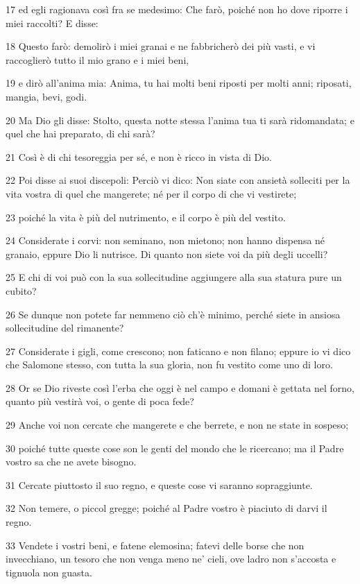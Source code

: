\par 17 ed egli ragionava così fra se medesimo: Che farò, poiché non ho dove riporre i miei raccolti? E disse:
\par 18 Questo farò: demolirò i miei granai e ne fabbricherò dei più vasti, e vi raccoglierò tutto il mio grano e i miei beni,
\par 19 e dirò all'anima mia: Anima, tu hai molti beni riposti per molti anni; riposati, mangia, bevi, godi.
\par 20 Ma Dio gli disse: Stolto, questa notte stessa l'anima tua ti sarà ridomandata; e quel che hai preparato, di chi sarà?
\par 21 Così è di chi tesoreggia per sé, e non è ricco in vista di Dio.
\par 22 Poi disse ai suoi discepoli: Perciò vi dico: Non siate con ansietà solleciti per la vita vostra di quel che mangerete; né per il corpo di che vi vestirete;
\par 23 poiché la vita è più del nutrimento, e il corpo è più del vestito.
\par 24 Considerate i corvi: non seminano, non mietono; non hanno dispensa né granaio, eppure Dio li nutrisce. Di quanto non siete voi da più degli uccelli?
\par 25 E chi di voi può con la sua sollecitudine aggiungere alla sua statura pure un cubito?
\par 26 Se dunque non potete far nemmeno ciò ch'è minimo, perché siete in ansiosa sollecitudine del rimanente?
\par 27 Considerate i gigli, come crescono; non faticano e non filano; eppure io vi dico che Salomone stesso, con tutta la sua gloria, non fu vestito come uno di loro.
\par 28 Or se Dio riveste così l'erba che oggi è nel campo e domani è gettata nel forno, quanto più vestirà voi, o gente di poca fede?
\par 29 Anche voi non cercate che mangerete e che berrete, e non ne state in sospeso;
\par 30 poiché tutte queste cose son le genti del mondo che le ricercano; ma il Padre vostro sa che ne avete bisogno.
\par 31 Cercate piuttosto il suo regno, e queste cose vi saranno sopraggiunte.
\par 32 Non temere, o piccol gregge; poiché al Padre vostro è piaciuto di darvi il regno.
\par 33 Vendete i vostri beni, e fatene elemosina; fatevi delle borse che non invecchiano, un tesoro che non venga meno ne' cieli, ove ladro non s'accosta e tignuola non guasta.
